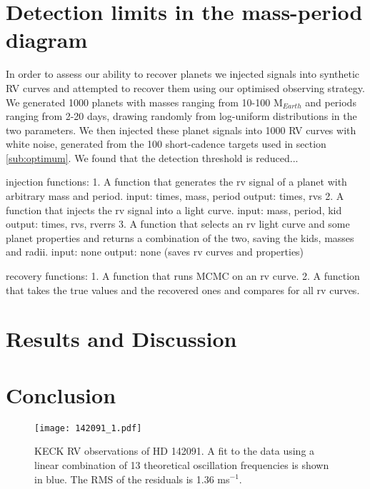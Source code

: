 \documentclass[useAMS, usenatbib]{aastex}
\begin{document}
\section{Detection limits in the mass-period diagram}

In order to assess our ability to recover planets we injected signals into
synthetic RV curves and attempted to recover them using our optimised observing
strategy.
We generated 1000 planets with masses ranging from 10-100 M$_{Earth}$ and
periods ranging from 2-20 days, drawing randomly from log-uniform
distributions in the two parameters.
We then injected these planet signals into 1000 RV curves with white noise,
generated from the 100 short-cadence targets used in section \ref{sub:optimum}.
We found that the detection threshold is reduced...

injection functions:
1. A function that generates the rv signal of a planet with arbitrary mass and
period.
input: times, mass, period
output: times, rvs
2. A function that injects the rv signal into a light curve.
input: mass, period, kid
output: times, rvs, rverrs
3. A function that selects an rv light curve and some planet properties and
returns a combination of the two, saving the kids, masses and radii.
input: none
output: none (saves rv curves and properties)

recovery functions:
1. A function that runs MCMC on an rv curve.
2. A function that takes the true values and the recovered ones and compares
for all rv curves.

\section{Results and Discussion}
\label{results}

\section{Conclusion}
\label{conclusion}

\begin{figure*}
\begin{center}
\texttt{[image: 142091\_1.pdf]}
\caption{KECK RV observations of HD 142091. A fit to the data using a linear
combination of 13 theoretical oscillation frequencies is shown in blue. The RMS
of the residuals is 1.36 ms$^{-1}$.}
\label{fig:k2_1}
\end{center}
\end{figure*}
\end{document}
